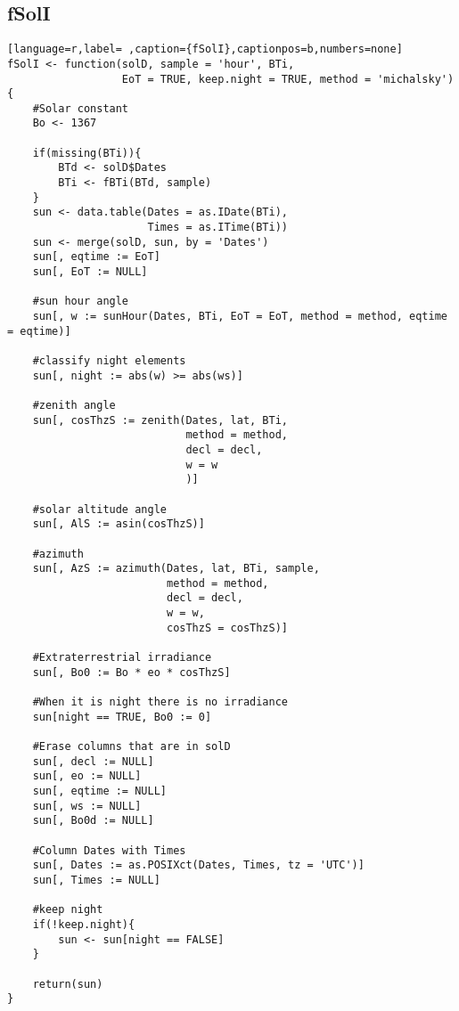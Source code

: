 \subsection{fSolI}
\label{sec:org0fdc81f}
\label{subsec:fsoli}
\begin{lstlisting}[language=r,label= ,caption={fSolI},captionpos=b,numbers=none]
fSolI <- function(solD, sample = 'hour', BTi,
                  EoT = TRUE, keep.night = TRUE, method = 'michalsky')
{
    #Solar constant
    Bo <- 1367

    if(missing(BTi)){
        BTd <- solD$Dates
        BTi <- fBTi(BTd, sample)
    }
    sun <- data.table(Dates = as.IDate(BTi),
                      Times = as.ITime(BTi))
    sun <- merge(solD, sun, by = 'Dates')
    sun[, eqtime := EoT]
    sun[, EoT := NULL]

    #sun hour angle
    sun[, w := sunHour(Dates, BTi, EoT = EoT, method = method, eqtime = eqtime)]

    #classify night elements
    sun[, night := abs(w) >= abs(ws)]

    #zenith angle
    sun[, cosThzS := zenith(Dates, lat, BTi,
                            method = method,
                            decl = decl,
                            w = w
                            )]

    #solar altitude angle
    sun[, AlS := asin(cosThzS)]

    #azimuth
    sun[, AzS := azimuth(Dates, lat, BTi, sample,
                         method = method,
                         decl = decl, 
                         w = w,
                         cosThzS = cosThzS)]

    #Extraterrestrial irradiance
    sun[, Bo0 := Bo * eo * cosThzS]

    #When it is night there is no irradiance
    sun[night == TRUE, Bo0 := 0]

    #Erase columns that are in solD
    sun[, decl := NULL]
    sun[, eo := NULL]
    sun[, eqtime := NULL]
    sun[, ws := NULL]
    sun[, Bo0d := NULL]

    #Column Dates with Times
    sun[, Dates := as.POSIXct(Dates, Times, tz = 'UTC')]
    sun[, Times := NULL]

    #keep night
    if(!keep.night){
        sun <- sun[night == FALSE]
    }

    return(sun)
}
\end{lstlisting}
